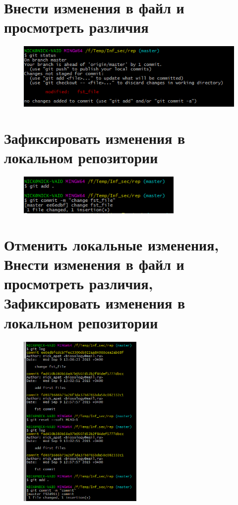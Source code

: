 \documentclass[utf8x, 12pt]{G7-32}
\begin{document}
\section{Внести изменения в файл и просмотреть различия}

\begin{figure}[hhh!]
	\begin{center}
		\includegraphics[width=12cm]{img/5}
	\end{center}
\end{figure}


\section{Зафиксировать изменения в локальном репозитории}

\begin{figure}[hhh!]
	\begin{center}
		\includegraphics[width=8cm]{img/6}
	\end{center}
\end{figure}

\newpage

\section{Отменить локальные изменения, Внести изменения в файл и просмотреть различия, Зафиксировать изменения в локальном репозитории}

\begin{figure}[hhh!]
	\begin{center}
		\includegraphics[width=6cm]{img/7}
	\end{center}
\end{figure}
\end{document}
